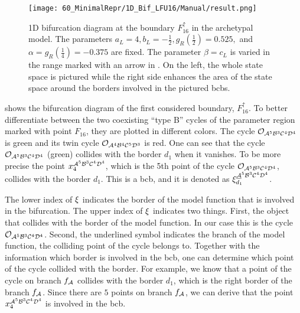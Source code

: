 \begin{figure}
	\centering
	\texttt{[image: 60\_MinimalRepr/1D\_Bif\_LFU16/Manual/result.png]}
	\caption[1D bifurcation diagram at the boundary $F_{16}^\uparrow$ in the archetypal model]{
		1D bifurcation diagram at the boundary $F_{16}^\uparrow$ in the archetypal model.
		The parameters $a_L = 4, b_L = -\frac{1}{2}, g_R\left(\frac{1}{2}\right) = 0.525,$ and $\alpha = g_R\left(\frac{1}{4}\right) = -0.375$ are fixed.
		The parameter $\beta = c_L$ is varied in the range marked with an arrow in .
		On the left, the whole state space is pictured while the right side enhances the area of the state space around the borders involved in the pictured \glspl{bcb}.
	}
	\label{fig:arch.bif.F.up}
\end{figure}

 shows the bifurcation diagram of the first considered boundary, $F_{16}^\uparrow$.
To better differentiate between the two coexisting ``type B'' cycles of the parameter region marked with point $F_{16}$, they are plotted in different colors.
The cycle $\mathcal{O}_{\mathcal{A}^5\mathcal{B}^3\mathcal{C}^4\mathcal{D}^4}$ is green and its twin cycle $\mathcal{O}_{\mathcal{A}^4\mathcal{B}^4\mathcal{C}^5\mathcal{D}^3}$ is red.
One can see that the cycle $\mathcal{O}_{\mathcal{A}^5\mathcal{B}^3\mathcal{C}^4\mathcal{D}^4}$ (green) collides with the border $d_1$ when it vanishes.
To be more precise the point $x_4^{\mathcal{A}^5\mathcal{B}^3\mathcal{C}^4\mathcal{D}^4}$, which is the 5th point of the cycle $\mathcal{O}_{\mathcal{A}^5\mathcal{B}^3\mathcal{C}^4\mathcal{D}^4}$, collides with the border $d_1$.
This is a \gls{bcb}, and it is denoted as $\xi_{d_1}^{\underline{\mathcal{A}}^5\mathcal{B}^3\mathcal{C}^4\mathcal{D}^4}$.

The lower index of $\xi$ indicates the border of the model function that is involved in the bifurcation.
The upper index of $\xi$ indicates two things.
First, the object that collides with the border of the model function.
In our case this is the cycle $\mathcal{O}_{\mathcal{A}^5\mathcal{B}^3\mathcal{C}^4\mathcal{D}^4}$.
Second, the underlined symbol indicates the branch of the model function, the colliding point of the cycle belongs to.
Together with the information which border is involved in the \gls{bcb}, one can determine which point of the cycle collided with the border.
For example, we know that a point of the cycle on branch $f_{\mathcal{A}}$ collides with the border $d_1$, which is the right border of the branch $f_{\mathcal{A}}$.
Since there are $5$ points on branch $f_{\mathcal{A}}$, we can derive that the point $x_4^{\mathcal{A}^5\mathcal{B}^3\mathcal{C}^4\mathcal{D}^4}$ is involved in the \gls{bcb}.

